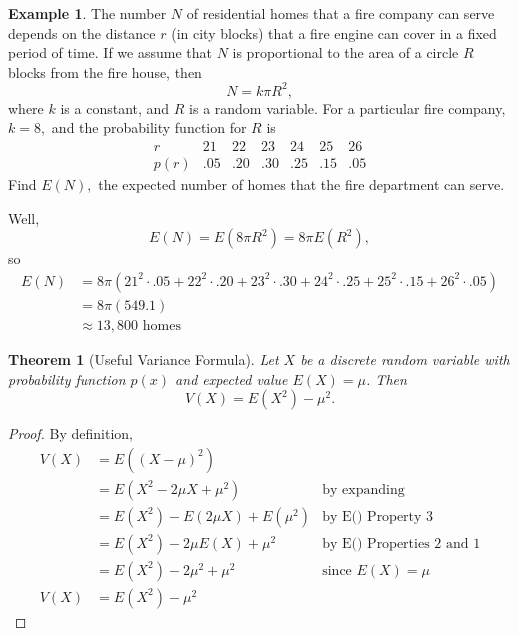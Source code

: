 \documentclass[
]{book}
\newtheorem{theorem}{Theorem}[chapter]
\theoremstyle{definition}
\theoremstyle{definition}
\newtheorem{example}{Example}[chapter]
\theoremstyle{definition}
\theoremstyle{definition}
\theoremstyle{remark}
\begin{document}
\begin{example}
\protect\hypertarget{exm:homes-near-firehouse}{}\label{exm:homes-near-firehouse}The number \(N\) of residential homes that a fire company can serve depends on the distance \(r\) (in city blocks) that a fire engine can cover in a fixed period of time. If we assume that \(N\) is proportional to the area of a circle \(R\) blocks from the fire house, then \[N = k \pi R^2,\] where \(k\) is a constant, and \(R\) is a random variable. For a particular fire company, \(k = 8,\) and the probability function for \(R\) is
\[
\begin{array}{c|c|c|c|c|c|c|c}
r    &  21 &  22 &  23 &  24 & 25 & 26 \\ \hline
p(r) & .05 & .20 & .30 & .25 & .15 & .05
\end{array}
\]
Find \(E(N),\) the expected number of homes that the fire department can serve.

Well, \[E(N) = E(8\pi R^2) = 8\pi E(R^2),\]
so
\begin{align*}
E(N) &= 8\pi\left(21^2\cdot .05 + 22^2 \cdot .20 + 23^2 \cdot .30 + 24^2 \cdot .25 + 25^2 \cdot .15 + 26^2 \cdot .05\right) \\
&= 8\pi(549.1) \\
&\approx 13,800 \text{ homes}
\end{align*}
\end{example}

\begin{theorem}[Useful Variance Formula]
\protect\hypertarget{thm:variance-shortcut}{}\label{thm:variance-shortcut}Let \(X\) be a discrete random variable with probability function \(p(x)\) and expected value \(E(X) = \mu\). Then \[V(X) = E(X^2)-\mu^2.\]
\end{theorem}

\begin{proof}
By definition,
\begin{align*}
V(X) &= E((X-\mu)^2)\\
     &= E(X^2 - 2\mu X + \mu^2) &\text{by expanding}\\
     &= E(X^2) - E(2\mu X) + E(\mu^2) &\text{by E() Property 3} \\ 
     &= E(X^2) - 2\mu E(X) + \mu^2 &\text{by E() Properties 2 and 1}\\
     &= E(X^2) - 2\mu^2 + \mu^2 & \text{since }E(X)=\mu \\
V(X) &= E(X^2) - \mu^2
\end{align*}
\end{proof}
\end{document}
